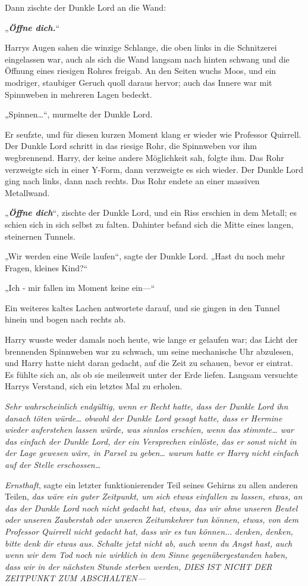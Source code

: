 {Dann zischte der Dunkle Lord an die Wand:

„\textbf{\emph{Öffne dich.}}“

Harrys Augen sahen die winzige Schlange, die oben links in die Schnitzerei eingelassen war, auch als sich die Wand langsam nach hinten schwang und die Öffnung eines riesigen Rohres freigab. An den Seiten wuchs Moos, und ein modriger, staubiger Geruch quoll daraus hervor; auch das Innere war mit Spinnweben in mehreren Lagen bedeckt.

„Spinnen…“, murmelte der Dunkle Lord.

Er seufzte, und für diesen kurzen Moment klang er wieder wie Professor Quirrell. Der Dunkle Lord schritt in das riesige Rohr, die Spinnweben vor ihm wegbrennend. Harry, der keine andere Möglichkeit sah, folgte ihm. Das Rohr verzweigte sich in einer Y-Form, dann verzweigte es sich wieder. Der Dunkle Lord ging nach links, dann nach rechts. Das Rohr endete an einer massiven Metallwand.

„\textbf{\emph{Öffne dich}}“, zischte der Dunkle Lord, und ein Riss erschien in dem Metall; es schien sich in sich selbst zu falten. Dahinter befand sich die Mitte eines langen, steinernen Tunnels.

„Wir werden eine Weile laufen“, sagte der Dunkle Lord. „Hast du noch mehr Fragen, kleines Kind?“

„Ich - mir fallen im Moment keine ein—“

Ein weiteres kaltes Lachen antwortete darauf, und sie gingen in den Tunnel hinein und bogen nach rechts ab.

Harry wusste weder damals noch heute, wie lange er gelaufen war; das Licht der brennenden Spinnweben war zu schwach, um seine mechanische Uhr abzulesen, und Harry hatte nicht daran gedacht, auf die Zeit zu schauen, bevor er eintrat. Es fühlte sich an, als ob sie meilenweit unter der Erde liefen. Langsam versuchte Harrys Verstand, sich ein letztes Mal zu erholen.

\emph{Sehr wahrscheinlich endgültig, wenn er Recht hatte, dass der Dunkle Lord ihn danach töten würde… obwohl der Dunkle Lord gesagt hatte, dass er Hermine wieder auferstehen lassen würde, was sinnlos erschien, wenn das stimmte… war das einfach der Dunkle Lord, der ein Versprechen einlöste, das er sonst nicht in der Lage gewesen wäre, in Parsel zu geben… warum hatte er Harry nicht einfach auf der Stelle erschossen…}

\emph{Ernsthaft}, sagte ein letzter funktionierender Teil seines Gehirns zu allen anderen Teilen, \emph{das wäre ein guter Zeitpunkt, um sich etwas einfallen zu lassen, etwas, an das der Dunkle Lord noch nicht gedacht hat, etwas, das wir ohne unseren Beutel oder unseren Zauberstab oder unseren Zeitumkehrer tun können, etwas, von dem Professor Quirrell nicht gedacht hat, dass wir es tun können.}.. \emph{denken, denken, bitte denk dir etwas aus. Schalte jetzt nicht ab, auch wenn du Angst hast, auch wenn wir dem Tod noch nie wirklich in dem Sinne gegenübergestanden haben, dass wir in der nächsten Stunde sterben werden, DIES IST NICHT DER ZEITPUNKT ZUM ABSCHALTEN—}

}
